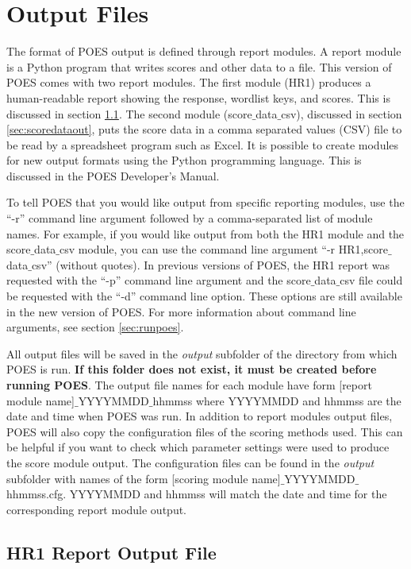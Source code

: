 \documentclass[11pt]{article}
\numberwithin{figure}{section}
\numberwithin{table}{section}
\begin{document}
\section{Output Files}
\label{sec:output}
The format of POES output is defined through report modules.  A report module is a Python program that writes scores and other data to a file.
This version of POES comes with two report modules.  The first module (HR1) produces a human-readable report showing the response, wordlist keys, and scores.  This is discussed in section \ref{sec:scorereportout}.  The second module (score$\_$data$\_$csv), discussed in section \ref{sec:scoredataout}, puts the score data in a comma separated values (CSV) file to be read by a spreadsheet program such as Excel.  
It is possible to create modules for new output formats using the Python programming language.  This is discussed in the POES Developer's Manual.


To tell POES that you would like output from specific reporting modules, use the ``-r'' command line argument followed by a comma-separated list of module names. For example, if you would like output from both the HR1 module and the score$\_$data$\_$csv module, you can use the command line argument ``-r HR1,score$\_$data$\_$csv'' (without quotes).
In previous versions of POES, the HR1 report was requested with the ``-p'' command line argument and the score$\_$data$\_$csv file could be requested with the ``-d'' command line option.  These options are still available in the new version of POES.  For more information about command line arguments, see section \ref{sec:runpoes}.

All output files will be saved in the \emph{output} subfolder of the directory from which POES is run.  \textbf{If this folder does not exist, it must be created before running POES}.  The output file names for each module have form [report module name]$\_$YYYYMMDD$\_$hhmmss where YYYYMMDD and hhmmss are the date and time when POES was run.  In addition to report modules output files, POES will also copy the configuration files of the scoring methods used.  This can be helpful if you want to check which parameter settings were used to produce the score module output.  The configuration files can be found in the \emph{output} subfolder with names of the form [scoring module name]$\_$YYYYMMDD$\_$hhmmss.cfg.  YYYYMMDD and hhmmss will match the date and time for the corresponding report module output.

\subsection{HR1 Report Output File}
\label{sec:scorereportout}
\end{document}
